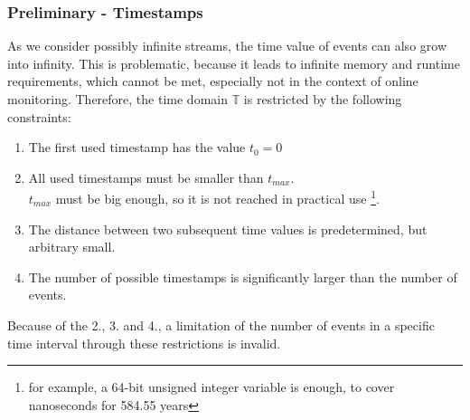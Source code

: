 	\subsubsection{Preliminary - Timestamps}
		\label{monitorability_timestamps}
		As we consider possibly infinite streams, the time value of events can also grow into infinity. This is problematic, because it leads to infinite memory and runtime requirements, which cannot be met, especially not in the context of online monitoring. Therefore, the time domain $\mathbb{T}$ is restricted by the following constraints:
		\begin{enumerate}[1.]
			\item
				The first used timestamp has the value $t_0=0$
			\item
				All used timestamps must be smaller than $t_{max}$.\\
				$t_{max}$ must be big enough, so it is not reached in practical use \footnote{for example, a 64-bit unsigned integer variable is enough, to cover nanoseconds for 584.55 years}.
			\item
				The distance between two subsequent time values is predetermined, but arbitrary small.
			\item
				The number of possible timestamps is significantly larger than the number of events.
		\end{enumerate}
	Because of the 2., 3. and 4., a limitation of the number of events in a specific time interval through these restrictions is invalid.

